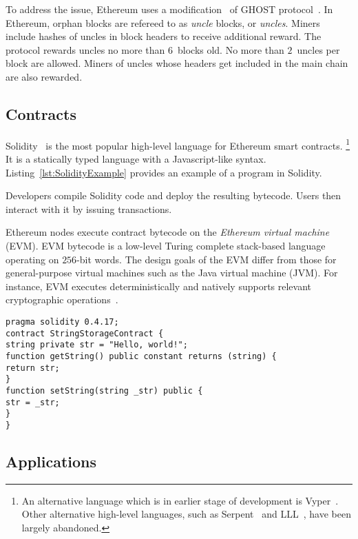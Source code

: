 To address the issue, Ethereum uses a modification~\cite{Lewenberg2015} of GHOST protocol~\cite{Sompolinsky2013, EthdocsMining}.
In Ethereum, orphan blocks are refereed to as \textit{uncle} blocks, or \textit{uncles}.
Miners include hashes of uncles in block headers to receive additional reward.
The protocol rewards uncles no more than $6$~blocks old.
No more than $2$~uncles per block are allowed.
Miners of uncles whose headers get included in the main chain are also rewarded.


\subsection{Contracts}

Solidity~\cite{Solidity17} is the most popular high-level language for Ethereum smart contracts.
\footnote{An alternative language which is in earlier stage of development is Vyper~\cite{Vyper}. Other alternative high-level languages, such as Serpent~\cite{SerpentGithub} and LLL~\cite{Ellison2017}, have been largely abandoned.}
It is a statically typed language with a Javascript-like syntax.
Listing~\ref{lst:SolidityExample} provides an example of a program in Solidity.

Developers compile Solidity code and deploy the resulting bytecode.
Users then interact with it by issuing transactions.

Ethereum nodes execute contract bytecode on the \textit{Ethereum virtual machine} (EVM).
EVM bytecode is a low-level Turing complete stack-based language operating on $256$-bit words.
The design goals of the EVM differ from those for general-purpose virtual machines such as the Java virtual machine (JVM).
For instance, EVM executes deterministically and natively supports relevant cryptographic operations~\cite{Buterin2017}.

\begin{lstlisting}[language=Solidity, label={lst:SolidityExample}, caption=A simple contract in Solidity]
pragma solidity 0.4.17;
contract StringStorageContract {
string private str = "Hello, world!";
function getString() public constant returns (string) {
return str;
}
function setString(string _str) public {
str = _str;
}
}
\end{lstlisting}


\subsection{Applications}

